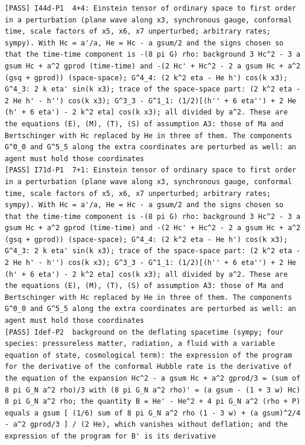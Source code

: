 \documentclass[
  10pt,
]{article}
\begin{document}
\begin{verbatim}
[PASS] I44d-P1  4+4: Einstein tensor of ordinary space to first order in a perturbation (plane wave along x3, synchronous gauge, conformal time, scale factors of x5, x6, x7 unperturbed; arbitrary rates; sympy). With Hc = a'/a, He = Hc - a gsum/2 and the signs chosen so that the time-time component is -(8 pi G) rho: background 3 Hc^2 - 3 a gsum Hc + a^2 gprod (time-time) and -(2 Hc' + Hc^2 - 2 a gsum Hc + a^2 (gsq + gprod)) (space-space); G^4_4: (2 k^2 eta - He h') cos(k x3); G^4_3: 2 k eta' sin(k x3); trace of the space-space part: (2 k^2 eta - 2 He h' - h'') cos(k x3); G^3_3 - G^1_1: (1/2)[(h'' + 6 eta'') + 2 He (h' + 6 eta') - 2 k^2 eta] cos(k x3); all divided by a^2. These are the equations (E), (M), (T), (S) of assumption A3: those of Ma and Bertschinger with Hc replaced by He in three of them. The components G^0_0 and G^5_5 along the extra coordinates are perturbed as well: an agent must hold those coordinates
[PASS] I71d-P1  7+1: Einstein tensor of ordinary space to first order in a perturbation (plane wave along x3, synchronous gauge, conformal time, scale factors of x5, x6, x7 unperturbed; arbitrary rates; sympy). With Hc = a'/a, He = Hc - a gsum/2 and the signs chosen so that the time-time component is -(8 pi G) rho: background 3 Hc^2 - 3 a gsum Hc + a^2 gprod (time-time) and -(2 Hc' + Hc^2 - 2 a gsum Hc + a^2 (gsq + gprod)) (space-space); G^4_4: (2 k^2 eta - He h') cos(k x3); G^4_3: 2 k eta' sin(k x3); trace of the space-space part: (2 k^2 eta - 2 He h' - h'') cos(k x3); G^3_3 - G^1_1: (1/2)[(h'' + 6 eta'') + 2 He (h' + 6 eta') - 2 k^2 eta] cos(k x3); all divided by a^2. These are the equations (E), (M), (T), (S) of assumption A3: those of Ma and Bertschinger with Hc replaced by He in three of them. The components G^0_0 and G^5_5 along the extra coordinates are perturbed as well: an agent must hold those coordinates
[PASS] Idef-P2  background on the deflating spacetime (sympy; four species: pressureless matter, radiation, a fluid with a variable equation of state, cosmological term): the expression of the program for the derivative of the conformal Hubble rate is the derivative of the equation of the expansion Hc^2 - a gsum Hc + a^2 gprod/3 = (sum of 8 pi G_N a^2 rho)/3 with (8 pi G_N a^2 rho)' = (a gsum - (1 + 3 w) Hc) 8 pi G_N a^2 rho; the quantity B = He' - He^2 + 4 pi G_N a^2 (rho + P) equals a gsum [ (1/6) sum of 8 pi G_N a^2 rho (1 - 3 w) + (a gsum)^2/4 - a^2 gprod/3 ] / (2 He), which vanishes without deflation; and the expression of the program for B' is its derivative

\end{verbatim}
\end{document}
